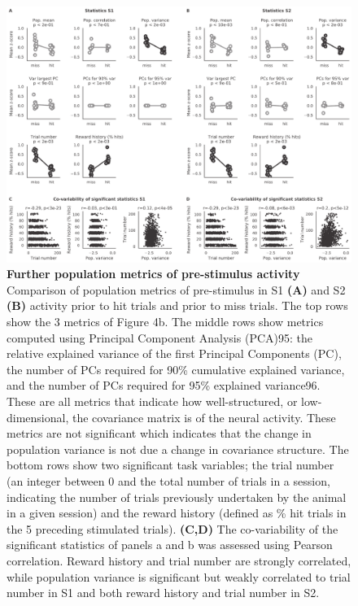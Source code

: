 \begin{figure}[h!]
\vspace*{-1.5cm}
\hspace*{-0.6in}
\includegraphics[scale=0.48]{figures/supplements/Supplementary_Figure6.pdf}
\caption[\textbf{Further population metrics of pre-stimulus activity
}]{\textbf{Further population metrics of pre-stimulus activity
} 
Comparison of population metrics of pre-stimulus in  S1 \textbf{(A)} and S2 \textbf{(B)} activity prior to hit trials and prior to miss trials. The top rows show the 3 metrics of Figure 4b. The middle rows show metrics computed using Principal Component Analysis (PCA)95: the relative explained variance of the first Principal Components (PC), the number of PCs required for 90\% cumulative explained variance, and the number of PCs required for 95\% explained variance96. These are all metrics that indicate how well-structured, or low-dimensional, the covariance matrix is of the neural activity. These metrics are not significant which indicates that the change in population variance is not due a change in covariance structure. The bottom rows show two significant task variables; the trial number (an integer between 0 and the total number of trials in a session, indicating the number of trials previously undertaken by the animal in a given session) and the reward history (defined as \% hit trials in the 5 preceding stimulated trials). \textbf{(C,D)} The co-variability of the significant statistics of panels a and b was assessed using Pearson correlation. Reward history and trial number are strongly correlated, while population variance is significant but weakly correlated to trial number in S1 and both reward history and trial number in S2. 
} 
\label{fig:supp6}
\end{figure}












